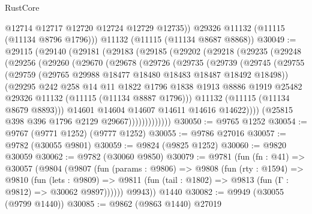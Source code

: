 \begin{lexlean}{RustCore}
\begin{coremodule}
          @12714
          @12717
          @12720
          @12724
          @12729
          @12735))
      @29326
      @11132
      (@11115 (@11134 @8796 @1796)))
    @11132
    (@11115 (@11134 @8687 @8868))
@30049 := @29115
    (@29140
      (@29181
        (@29183
          (@29185
            (@29202
              (@29218
                (@29235
                  (@29248
                    (@29256
                      (@29260
                        (@29670
                          (@29678
                            (@29726
                              (@29735
                                (@29739
                                  (@29745
                                    (@29755
                                      (@29759
                                        (@29765 @29988 @18477 @18480 @18483 @18487 @18492 @18498))
                                      (@29295
                                        @242
                                        @258
                                        @14
                                        @11
                                        @1822
                                        @1796
                                        @1838
                                        @1913
                                        @8886
                                        @1919
                                        @25482
                                        @29326
                                        @11132
                                        (@11115 (@11134 @8887 @1796)))
                                      @11132
                                      (@11115 (@11134 @8679 @8893)))
                                    @14601
                                    @14604
                                    @14607
                                    @14611
                                    @14616
                                    @14622))))
                            (@25815 @398 @396 @1796 @2129 @29667)))))))))))))
@30050 := @9765 @1252
@30054 := @9767 (@9771 @1252) (@9777 @1252)
@30055 := @9786 @27016
@30057 := @9782 (@30055 @9801)
@30059 := @9824 (@9825 @1252)
@30060 := @9820 @30059
@30062 := @9782 (@30060 @9850)
@30079 := @9781
    (fun (fn : @41) =>
    @30057
      (@9804
        (@9807
          (fun (params : @9806) =>
          @9808
            (fun (rty : @1594) =>
            @9810
              (fun (lets : @9809) =>
              @9811 (fun (tail : @1802) => @9813 (fun (Γ : @9812) => @30062 @9897))))))
        @9943))
    @1440
@30082 := @9949 (@30055 (@9799 @1440))
@30085 := @9862 (@9863 @1440) @27019

\end{coremodule}
\end{lexlean}
